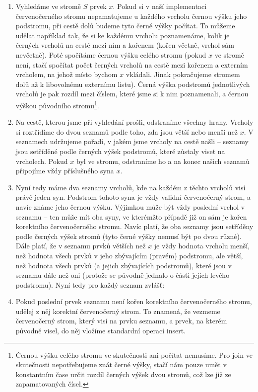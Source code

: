 \begin{enumerate}

\item Vyhledáme ve stromě $S$ prvek $x$. Pokud si v naší implementaci
červenočerného stromu nepamatujeme u každého vrcholu černou výšku jeho
podstromu, při cestě dolů budeme tyto černé výšky počítat. To můžeme udělat
například tak, že si ke každému vrcholu poznamenáme, kolik je černých vrcholů
na cestě mezi ním a kořenem (kořen včetně, vrchol sám nevčetně). Poté spočítáme
černou výšku celého stromu (pokud $x$ ve stromě není, stačí spočítat počet
černých vrcholů na cestě mezi kořenem a externím vrcholem, na jehož místo
bychom $x$ vkládali. Jinak pokračujeme stromem dolů až k libovolnému externímu
listu). Černá výška podstromů jednotlivých vrcholů je pak rozdíl mezi číslem,
které jsme si k nim poznamenali, a černou výškou původního
stromu\footnote{Černou výšku celého stromu ve skutečnosti ani počítat nemusíme.
Pro join ve skutečnosti nepotřebujeme znát černé výšky, stačí nám pouze umět v
konstantním čase určit rozdíl černých výšek dvou stromů, což lze již ze
zapamatovaných čísel.}.

\item Na cestě, kterou jsme při vyhledání prošli, odstraníme všechny hrany.
Vrcholy si roztřídíme do dvou seznamů podle toho, zda jsou větší nebo menší než
$x$. V seznamech udržujeme pořadí, v jakém jsme vrcholy na cestě našli --
seznamy jsou setříděné podle černých výšek podstromů, které zůstaly viset na
vrcholech. Pokud $x$ byl ve stromu, odstraníme ho a na konec našich seznamů
připojíme vždy příslušného syna $x$.

\item Nyní tedy máme dva seznamy vrcholů, kde na každém z těchto vrcholů visí
právě jeden syn. Podstrom tohoto syna je vždy validní červenočerný strom, a
navíc známe jeho černou výšku. Výjimkou může být vždy poslední vrchol v seznamu
-- ten může mít oba syny, ve kterémžto případě již on sám je kořen korektního
červenočerného stromu. Navíc platí, že oba seznamy jsou setříděny podle černých výšek stromů (tyto černé výšky nemusí být po dvou různé). Dále platí, že v seznamu prvků větších než $x$ je vždy hodnota vrcholu menší, než hodnota všech prvků v jeho zbývajícím (pravém) podstromu, ale větší, než hodnota všech prvků (a jejich zbývajících podstromů), které jsou v seznamu dále než oni (protože se původně jednalo o části jejich levého podstromu). Nyní tedy pro každý seznam zvlášť:

\item Pokud poslední prvek seznamu není kořen korektního červenočerného stromu, udělej z něj korektní červenočerný strom. To znamená, že vezmeme červenočerný strom, který visí na prvku seznamu, a prvek, na kterém původně visel, do něj vložíme standardní operací insert.


\end{enumerate}

